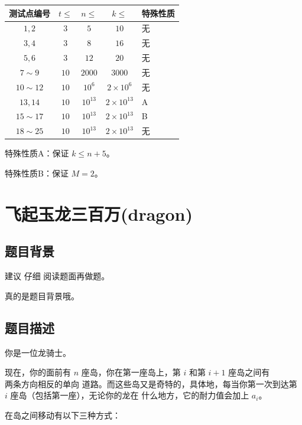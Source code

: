 \documentclass[12pt,a4paper,oneside]{ctexart}
\newcommand{\ChineseprobD}{飞起玉龙三百万}
\newcommand{\probD}{dragon}
\begin{document}
  \begin{center}
    \begin{tabularx}{10cm}{|c|c|c|c|X<{\centering}|}
      \hline
      测试点编号 & $t\le$ & $n \le$ & $k \le$ & 特殊性质  \\
      \hline
 $1,2$ & $3$ & $5$ & $10$ & 无  \\ 
\hline
 $3,4$ & $3$ & $8$ & $16$ & 无  \\ 
\hline
 $5,6$ & $3$ & $12$ & $20$ & 无  \\ 
\hline
 $7 \sim 9$ & $10$ & $2000$ & $3000$ & 无  \\ 
\hline
 $10 \sim 12$ & $10$ & $10^6$ & $2 \times 10^6$ & 无  \\ 
\hline
 $13,14$ & $10$ & $10^{13}$ & $2 \times 10^{13}$ & A  \\ 
\hline
 $15 \sim 17$ & $10$ & $10^{13}$ & $2 \times 10^{13}$ & B  \\ 
\hline
 $18 \sim 25$ & $10$ & $10^{13}$ & $2 \times 10^{13}$ & 无  \\ 
\hline
    \end{tabularx}
  \end{center}

特殊性质A：保证 $k\leq n+5$。

特殊性质B：保证 $M=2$。
\newpage

\section{\rm \ChineseprobD (\probD)}

\subsection*{题目背景}

建议 $\textbf{仔细}$ 阅读题面再做题。

真的是题目背景哦。

\subsection*{题目描述}

你是一位龙骑士。

现在，你的面前有 $n$ 座岛，你在第一座岛上，第 $i$ 和第 $i+1$ 座岛之间有 $\textbf{两条方向相反的单向}$ $\textbf{道路}$。而这些岛又是奇特的，具体地，每当你第一次到达第 $i$ 座岛（包括第一座），$\textbf{无论你的龙在}$ $\textbf{什么地方}$，它的耐力值会加上 $a_{i}$。

在岛之间移动有以下三种方式：
\end{document}
